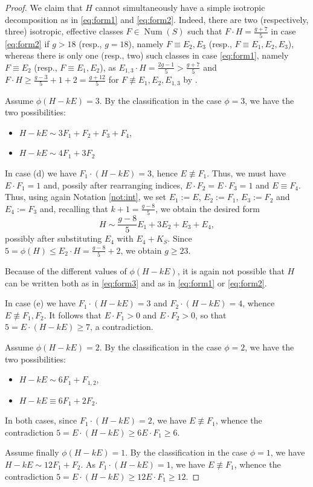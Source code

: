 \documentclass[11pt]{amsart}
\theoremstyle{definition}
\def\Num{\operatorname{Num}}
\begin{document}
\begin{proof}
We claim that $H$ cannot simultaneously have a simple isotropic decomposition as in \eqref{eq:form1} and \eqref{eq:form2}. Indeed,  there are two (respectively, three) isotropic, effective classes $F \in \Num(S)$ such that $F \cdot H=\frac{g+7}{5}$ in case \eqref{eq:form2} if $g >18$ (resp., $g=18$), namely $F \equiv E_2,E_3$ (resp., $F \equiv E_1,E_2,E_3$), whereas there is only one (resp., two) such classes in case \eqref{eq:form1}, namely $F \equiv E_2$ (resp., $F \equiv E_1,E_2$), as  $E_{1,3} \cdot H= \frac{2g-1}{5}>\frac{g+7}{5}$  and $F \cdot H \geqslant \frac{g-3}{5}+1+2=\frac{g+12}{5}$ for $F \not \equiv E_1,E_2,E_{1,3}$ by \cite[Lemma 2.1]{klvan}. \medskip


Assume  $\phi(H-kE)  = 3$.  By the classification in the case $\phi=3$, we have the two possibilities:
\begin{itemize}
\item[(d)] $H-kE \sim 3F_1+F_{2}+F_3+F_4$,
 \item[(e)] $H-kE \sim 4F_1+3F_2$
\end{itemize}
 
In case (d) we have $F_1 \cdot (H-kE)=3$, hence $E \not \equiv F_1$. Thus, we must have $E \cdot F_1=1$ and, possily after rearranging indices, $E \cdot F_2 =E \cdot F_3=1$ and $E \equiv F_4$. Thus, using again Notation \ref{not:int}, we set $E_1:=E$, $E_2:=F_1$, $E_3:=F_2$ and $E_{4}:=F_3$ and, recalling that $k+1=\frac{g-8}{5}$, we obtain the desired form
\begin{equation} \label{eq:form3} 
H \sim \frac{g-8}{5}E_1+3E_2+E_3+E_{4},
\end{equation}
possibly after substituting $E_4$ with $E_4+K_S$. Since  $5 =\phi(H) \leqslant E_2 \cdot H=\frac{g-8}{5}+2$, we obtain $g \geqslant 23$. 
 
 Because of the different values of $\phi(H-kE)$, it is again not possible that $H$ can be written both as in \eqref{eq:form3} and as in \eqref{eq:form1} or \eqref{eq:form2}.  

In case (e) we have $F_1 \cdot (H-kE)=3$ and $F_2 \cdot (H-kE)=4$, whence $E \not \equiv F_1, F_2$. It follows that $E \cdot F_1>0$ and $E \cdot F_2 >0$, so that $5=E \cdot (H-kE) \geqslant 7$, a contradiction.\medskip

Assume  $\phi(H-kE)  = 2$.  By the classification in the case $\phi=2$, we have 
the two possibilities:
\begin{itemize}
\item[(f)] $H-kE \sim 6F_1+F_{1,2}$,
 \item[(g)] $H-kE \equiv 6F_1+2F_2$.
\end{itemize}
In both cases,  since $F_1 \cdot (H-kE)=2$, we have $E \not \equiv F_1$, whence the contradiction $5=E \cdot(H-kE) \geqslant 6 E \cdot F_1 \geqslant 6$.\medskip

Assume finally $\phi(H-kE) = 1$. By the classification in the case $\phi=1$, we have 
$H-kE \sim 12F_1+F_2$. As $F_1 \cdot (H-kE)=1$, we have $E \not \equiv F_1$, whence the contradiction $5=E \cdot(H-kE) \geqslant 12 E \cdot F_1 \geqslant 12$.
\end{proof}
\end{document}
